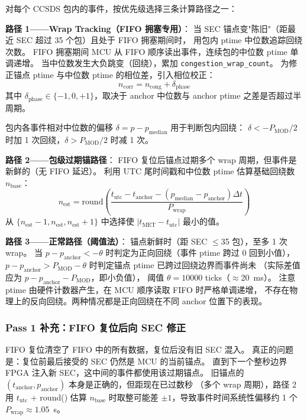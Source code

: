 \documentclass[aps,prd,twocolumn,nofootinbib,superscriptaddress]{revtex4-2}
\begin{document}
对每个 CCSDS 包内的事件，按优先级选择三条计算路径之一：

\textbf{路径 1——Wrap Tracking（FIFO 拥塞专用）}：
当 SEC 锚点变"陈旧"（距最近 SEC 超过 35 个包）且处于 FIFO 拥塞期间时，
用包内 ptime 中位数追踪回绕次数。
FIFO 拥塞期间 MCU 从 FIFO 顺序读出事件，连续包的中位数 ptime 单调递增。
当中位数发生大负跳变（回绕），累加 \texttt{congestion\_wrap\_count}。
为修正锚点 ptime 与中位数 ptime 的相位差，引入相位校正：
\begin{equation}
  n_\mathrm{corr} = n_\mathrm{cong} + \delta_\mathrm{phase}
\end{equation}
其中 $\delta_\mathrm{phase} \in \{-1, 0, +1\}$，取决于 anchor 中位数与
anchor ptime 之差是否超过半周期。

包内各事件相对中位数的偏移 $\delta = p - p_\mathrm{median}$ 用于判断包内回绕：
$\delta < -P_\mathrm{MOD}/2$ 时加 1 次回绕，$\delta > P_\mathrm{MOD}/2$ 时减 1 次。

\textbf{路径 2——包级过期锚路径}：
FIFO 复位后锚点过期多个 wrap 周期，但事件是新鲜的（无 FIFO 延迟）。
利用 UTC 尾时间戳和中位数 ptime 估算基础回绕数 $n_\mathrm{base}$：
\begin{equation}
  n_\mathrm{est} = \mathrm{round}\!\left(
    \frac{t_\mathrm{utc} - t_\mathrm{anchor} - (p_\mathrm{median} - p_\mathrm{anchor}) \Delta t}
    {P_\mathrm{wrap}}
  \right)
\end{equation}
从 $\{n_\mathrm{est}-1, n_\mathrm{est}, n_\mathrm{est}+1\}$ 中选择使
$|t_\mathrm{MET} - t_\mathrm{utc}|$ 最小的值。

\textbf{路径 3——正常路径（阈值法）}：
锚点新鲜时（距 SEC $\leq$35 包），至多 1 次 wrap。
当 $p - p_\mathrm{anchor} < -\theta$ 时判定为正向回绕（事件 ptime 跨过 0 回到小值），
$p - p_\mathrm{anchor} > P_\mathrm{MOD} - \theta$ 时判定锚点 ptime 已跨过回绕边界而事件尚未
（实际差值应为 $p - p_\mathrm{anchor} - P_\mathrm{MOD}$，即小负值），
阈值 $\theta = 10000$ ticks（$\approx$20~ms）。
注意 ptime 由硬件计数器产生，在 MCU 顺序读取 FIFO 时严格单调递增，
不存在物理上的反向回绕。两种情况都是正向回绕在不同 anchor 位置下的表现。

\subsubsection{Pass 1 补充：FIFO 复位后向 SEC 修正}

FIFO 复位清空了 FIFO 中的所有数据，复位后没有旧 SEC 混入。
真正的问题是：复位前最后接受的 SEC 仍然是 MCU 的当前锚点。
直到下一个整秒边界 FPGA 注入新 SEC，这中间的事件都使用该过期锚点。
旧锚点的 $(t_\mathrm{anchor}, p_\mathrm{anchor})$ 本身是正确的，但距现在已过数秒
（多个 wrap 周期），路径 2 用 $t_\mathrm{utc}$ + round() 估算 $n_\mathrm{base}$
时取整可能差 $\pm 1$，导致事件时间系统性偏移约 1 个 $P_\mathrm{wrap} \approx 1.05$~s。
\end{document}
